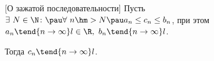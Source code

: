 [О зажатой последовательности]\label{lzp}
Пусть $\exists\  N\in\N\colon\pau \forall\  n\hm>N\pau a_n\leq c_n\leq b_n$, при этом $a_n\tend{n\to\infty}l\in\R,\ b_n\tend{n\to\infty}l$.

Тогда $c_n\tend{n\to\infty}l$.
